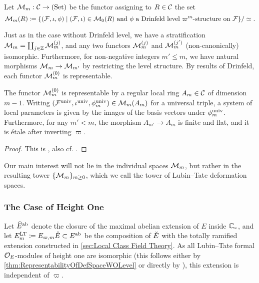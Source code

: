 \documentclass[../main.tex]{subfiles}
\begin{document}
\begin{defi}\label{def:LTDefSpaceWithLevel}
  Let $\mathcal{M}_m: \mathcal{C} \to {(\mathrm{Set})}$ be the functor assigning to $R \in \mathcal{C}$ the set 
  \begin{equation*}
    \mathcal{M}_m(R) \coloneqq \{(\mathcal{F}, \iota, \phi) \mid (\mathcal{F}, \iota) \in \mathcal{M}_0(R) \text{ and }\phi
    \text{ a Drinfeld level $\varpi^m$-structure on $\mathcal{F}$}\}/\simeq.
  \end{equation*}
\end{defi}

Just as in the case without Drinfeld level, we have a stratification $\mathcal{M}_m =
\coprod_{j \in \mathbb{Z}} \mathcal{M}_m^{(j)}$, and any two functors $\mathcal{M}_m^{(j)}$ and
$\mathcal{M}_m^{(j')}$ (non-canonically) isomorphic.
Furthermore, for non-negative integers $m' \leq m$, we have natural morphisms
$\mathcal{M}_m \to \mathcal{M}_{m'}$ by restricting the level structure. 
By results of Drinfeld, each functor $\mathcal{M}_m^{(0)}$ is representable.

\begin{thm}\label{thm:RepresentabilityOfDefSpaceWithLevel}
  The functor $\mathcal{M}_m^{(0)}$ is representable by a regular local ring $A_m \in \mathcal{C}$ of 
  dimension $m-1$. Writing $(\mathcal{F}^{\mathrm{univ}}, \iota^{\mathrm{univ}}, \phi_m^{\mathrm{univ}}) \in \mathcal{M}_m(A_m)$ for
  a universal triple, a system of local parameters is given by the images of the 
  basis vectors under $\phi_m^{\mathrm{univ}}$. Furthermore, for any $m' < m$, the morphism 
  $A_{m'} \to A_m$ is finite and flat, and it is \'etale after inverting $\varpi$. 
\begin{proof}
  This is \cite[Proposition 4.3]{drinfel1974elliptic}, also cf.
  \cite[Proposition 2.2.5]{Strauch2008DefSp}.
\end{proof}
\end{thm}

Our main interest will not lie in the individual spaces $\mathcal{M}_m$, but rather in
the resulting tower $\{\mathcal{M}_m\}_{m \geq 0}$, which we call the tower of
Lubin--Tate deformation spaces.


\subsubsection{The Case of Height One} %
\label{ssub:The Case of Height One}
Let $\widehat E^{\mathrm{ab}}$ denote the closure of the maximal abelian extension of $E$ inside
$\Cp$, and let $E_m^{\mathrm{LT}} \coloneq E_{\varpi, m}{\breve {E}} \subset E^{\mathrm{ab}}$ be the composition
of ${\breve {E}}$ with the totally ramified extension constructed in \cref{sec:Local
Class Field Theory}. As all Lubin--Tate formal $\mathcal{O}_E$-modules of height one
are isomorphic (this follows either by \cref{thm:RepresentabilityOfDefSpaceWOLevel} 
or directly by \cite[Lemma 2]{LubinTateFormalMult}), this extension is independent
of $\varpi$. 
\end{document}
